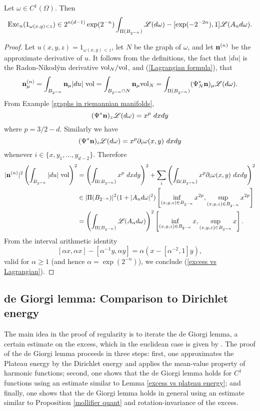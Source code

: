 \begin{lemma}\label{excess vs plateau energy}
Let $\omega \in C^1(\Omega)$. Then
\begin{equation}
    \operatorname{Exc}_n(1_{\omega(x, y) < z}) \in 2^{n(d - 1)} \exp(2^{-n}) \int_{\Pi(B_{2^{-n}})} \mathscr L(d\omega) - [\exp(-2^{-2n}), 1]\mathscr L(A_n d\omega). \label{excess vs Lagrangian}
\end{equation}
\end{lemma}
\begin{proof}
Let $u(x, y, z) = 1_{\omega(x, y) < z}$, let $N$ be the graph of $\omega$, and let $\mathbf n^{(n)}$ be the approximate derivative of $u$.
It follows from the definitions, the fact that $|du|$ is the Radon-Nikod\'ym derivative $\mathrm{vol}_N/\mathrm{vol}$, and (\ref{Lagrangian formula}), that
$$\mathbf n^{(n)}_\mu = \int_{B_{2^{-n}}} \mathbf n_\mu |du| ~\mathrm{vol} = \int_{B_{2^{-n}} \cap N} \mathbf n_\mu \mathrm{vol}_N = \int_{\Pi(B_{2^{-n}})} (\Psi_N^* \mathbf n)_\mu \mathscr L(d\omega).$$
From Example \ref{graphs in riemannian manifolds},
$$(\Psi^* \mathbf n)_z \mathscr L(d\omega) = x^p ~dxdy$$
where $p = 3/2 - d$. Similarly we have
$$(\Psi^* \mathbf n)_i \mathscr L(d\omega) = x^p \partial_i \omega(x, y) ~dxdy$$
whenever $i \in \{x, y_1, \dots, y_{d - 2}\}$.
Therefore
\begin{align*}
    |\mathbf n^{(n)}|^2 \left(\int_{B_{2^{-n}}} |du| ~\mathrm{vol}\right)^2 &= \left(\int_{\Pi(B_{2^{-n}})} x^p ~dxdy\right)^2 + \sum_i \left(\int_{\Pi(B_{2^{-n}})} x^p \partial_i \omega(x, y) ~dxdy \right)^2 \\
    &\in |\Pi(B_{2^{-n}})|^2 (1 + |A_nd\omega|^2) \left[\inf_{(x, y, z) \in B_{2^{-n}}} x^{2p}, \sup_{(x, y, z) \in B_{2^{-n}}} x^{2p}\right] \\
    &= \left(\int_{\Pi(B_{2^{-n}})} \mathscr L(A_nd\omega)\right)^2 \left[\inf_{(x, y, z) \in B_{2^{-n}}} x, \sup_{(x, y, z) \in B_{2^{-n}}} x\right].
\end{align*}
From the interval arithmetic identity
$$[\alpha x, \alpha x] - [\alpha^{-1}y, \alpha y] = \alpha(x - [\alpha^{-2}, 1]y),$$
valid for $\alpha \geq 1$ (and hence $\alpha = \exp(2^{-n})$),
we conclude (\ref{excess vs Lagrangian}).
\end{proof}


\subsection{de Giorgi lemma: Comparison to Dirichlet energy}
The main idea in the proof of regularity is to iterate the de Giorgi lemma, a certain estimate on the excess, which in the euclidean case is given by \cite[TODO]{Miranda66}.
The proof of the de Giorgi lemma proceeds in three steps: first, one approximates the Plateau energy by the Dirichlet energy and applies the mean-value property of harmonic functions; second, one shows that the de Giorgi lemma holds for $C^1$ functions using an estimate similar to Lemma \ref{excess vs plateau energy}; and finally, one shows that the de Giorgi lemma holds in general using an estimate similar to Proposition \ref{mollifier quant} and rotation-invariance of the excess.

